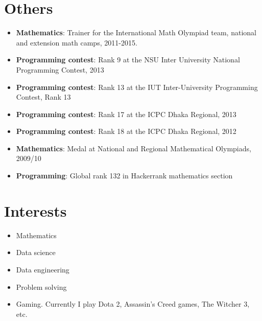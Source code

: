 \documentclass[letterpaper,11pt]{article}
\newcommand{\resumeItem}[2]{
	\item\small{
		\textbf{#1}{: #2 \vspace{-2pt}}
	}
}
\newcommand{\resumeSubItem}[2]{\resumeItem{#1}{#2}\vspace{-4pt}}
\newcommand{\resumeSubHeadingListStart}{\begin{itemize}[leftmargin=*]}
\newcommand{\resumeSubHeadingListEnd}{\end{itemize}}
\begin{document}
	\section{Others}
	\resumeSubHeadingListStart
	\resumeSubItem{Mathematics}{Trainer for the International Math Olympiad team, national and extension math camps, 2011-2015.}
	\resumeSubItem{Programming contest}{Rank 9 at the NSU Inter University National Programming Contest, 2013}
	\resumeSubItem{Programming contest}{Rank 13 at the IUT Inter-University Programming Contest, Rank 13}
	\resumeSubItem{Programming contest}{Rank 17 at the ICPC Dhaka Regional, 2013}
	\resumeSubItem{Programming contest}{Rank 18 at the ICPC Dhaka Regional, 2012}
	\resumeSubItem{Mathematics}{Medal at National and Regional Mathematical Olympiads, 2009/10}
	\resumeSubItem{Programming}{Global rank 132 in Hackerrank mathematics section}
	\resumeSubHeadingListEnd
	\section{Interests}
	\resumeSubHeadingListStart
	\item{Mathematics}
	\item{Data science}
	\item{Data engineering}
	\item{Problem solving}
	\item{Gaming. Currently I play Dota 2, Assassin's Creed games, The Witcher 3, etc.}
	\resumeSubHeadingListEnd
\end{document}
